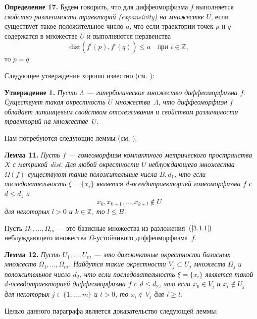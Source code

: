 \documentclass[12pt]{article}
\begin{document}
\textbf{Определение 17.} Будем говорить, что для диффеомор\-физ\-ма $f$ выполняется \textit{свойство различимости траекторий (expansivity) на множестве $U$}, если существует такое положительное число $a$, что если траектории точек $p$ и $q$ содержатся в множестве $U$ и выполняются неравенства 
$$\mbox{dist}(f^i(p),f^i(q))\leq a\quad\mbox{при }i\in\mathbb{Z},$$
то $p=q$.

Следующее утверждение хорошо известно (см. \cite{1,P2}):

\textbf{Утверждение 1.} \textit{Пусть $\Lambda$ --- гиперболическое множество диффеоморфизма $f$. Существует такая окрестность $U$ множества~$\Lambda$, что диффеоморфизм $f$ обладает липшицевым свойством отслеживания и свойством различимости траекторий на множестве~$U$.}

Нам потребуются следующие леммы (см. \cite{PT}):

\textbf{Лемма 11.} \textit{Пусть $f$ --- гомеоморфизм компактного метрического пространства $X$ с метрикой dist. Для любой окрестности $U$ неблуждающего множества $\Omega(f)$ существуют такие положительные числа $B,d_1$, что если последовательность $\xi=\{x_i\}$ является $d$-псевдотраекторией гомеоморфизма $f$	с $d\leq d_1$ и
$$x_k,x_{k+1},\ldots,x_{k+l}\notin U$$
для некоторых $l>0$ и $k\in\mathbb{Z}$, то $l\leq B$.}

Пусть $\Omega_1,\ldots,\Omega_m$ --- это базисные множества из разложения~$(\ref{3.1.1})$ неблуждающего множества $\Omega$-устойчивого диффеоморфизма~$f$.

\textbf{Лемма 12.} \textit{Пусть $U_1,\ldots,U_m$ --- это дизъюнктные окрестности базисных множеств $\Omega_1,\ldots,\Omega_m$. Найдутся такие окрестности $V_j\subset U_j$ множеств $\Omega_j$ и положительное число $d_2$, что если последовательность $\xi=\{x_i\}$ является такой $d$-псевдотраекторией диффеоморфизма $f$ с $d\leq d_2$, что если $x_0\in V_j$ и $x_t\notin U_j$ для некоторых $j\in\{1,\ldots,m\}$ и $t>0$, то $x_i\notin V_j$ для $i\geq t$.}

Целью данного параграфа является доказательство следующей леммы:
\end{document}
